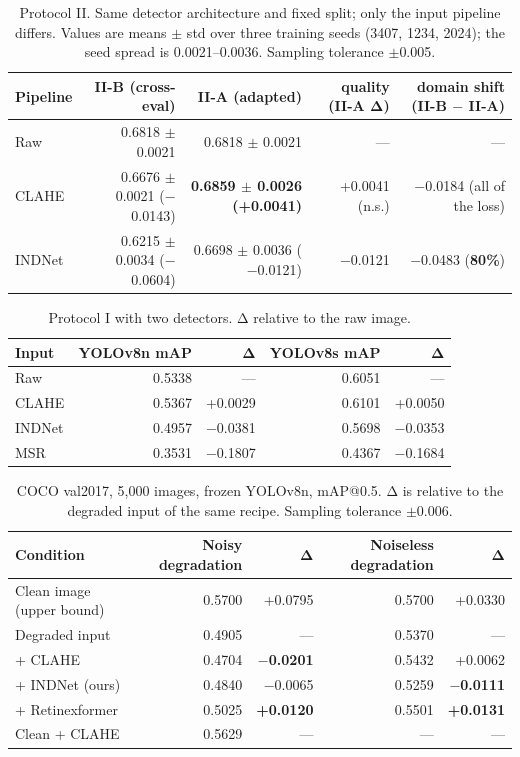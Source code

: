 \begin{table}[t]
\centering
\small
\caption{Protocol II. Same detector architecture and fixed split; only the input pipeline differs. Values are means $\pm$ std over three training seeds (3407, 1234, 2024); the seed spread is 0.0021–0.0036. Sampling tolerance $\pm$0.005.}
\label{tab:table4}
\begin{tabular}{lrrrr}
\toprule
Pipeline & II-B (cross-eval) & II-A (adapted) & quality (II-A Δ) & domain shift (II-B $-$ II-A) \\
\midrule
Raw & 0.6818 $\pm$ 0.0021 & 0.6818 $\pm$ 0.0021 & — & — \\
CLAHE & 0.6676 $\pm$ 0.0021 ($-$0.0143) & \textbf{0.6859 $\pm$ 0.0026 (+0.0041)} & +0.0041 (n.s.) & $-$0.0184 (all of the loss) \\
INDNet & 0.6215 $\pm$ 0.0034 ($-$0.0604) & 0.6698 $\pm$ 0.0036 ($-$0.0121) & $-$0.0121 & $-$0.0483 (\textbf{80\%}) \\
\bottomrule
\end{tabular}
\end{table}

\begin{table}[t]
\centering
\small
\caption{Protocol I with two detectors. Δ relative to the raw image.}
\label{tab:table5}
\begin{tabular}{lrrrr}
\toprule
Input & YOLOv8n mAP & Δ & YOLOv8s mAP & Δ \\
\midrule
Raw & 0.5338 & — & 0.6051 & — \\
CLAHE & 0.5367 & +0.0029 & 0.6101 & +0.0050 \\
INDNet & 0.4957 & $-$0.0381 & 0.5698 & $-$0.0353 \\
MSR & 0.3531 & $-$0.1807 & 0.4367 & $-$0.1684 \\
\bottomrule
\end{tabular}
\end{table}

\begin{table}[t]
\centering
\small
\caption{COCO val2017, 5,000 images, frozen YOLOv8n, mAP@0.5. Δ is relative to the degraded input of the same recipe. Sampling tolerance $\pm$0.006.}
\label{tab:table6}
\begin{tabular}{lrrrr}
\toprule
Condition & Noisy degradation & Δ & Noiseless degradation & Δ \\
\midrule
Clean image (upper bound) & 0.5700 & +0.0795 & 0.5700 & +0.0330 \\
Degraded input & 0.4905 & — & 0.5370 & — \\
+ CLAHE & 0.4704 & \textbf{$-$0.0201} & 0.5432 & +0.0062 \\
+ INDNet (ours) & 0.4840 & $-$0.0065 & 0.5259 & \textbf{$-$0.0111} \\
+ Retinexformer & 0.5025 & \textbf{+0.0120} & 0.5501 & \textbf{+0.0131} \\
Clean + CLAHE & 0.5629 & — & — & — \\
\bottomrule
\end{tabular}
\end{table}

